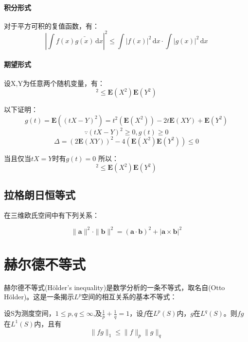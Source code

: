 \documentclass[a4paper]{article} %
\numberwithin{equation}{section} %
\newcommand{\ud}{\,\mathrm{d}}
\begin{document}
\paragraph{积分形式}
对于平方可积的复值函数，有：
$$
\left|\int f(x)\bar{g(x)}\ud x\right|^2\le \int |f(x)|^2\ud x\cdot\int |g(x)|^2\ud x
$$

\paragraph{期望形式}
设X,Y为任意两个随机变量，有：
\begin{equation}
[\mathbf E(XY)]^2\le \mathbf E(X^2)\mathbf E(Y^2)
\end{equation}

以下证明：
\begin{equation}
g(t)= \mathbf E((tX-Y)^2)=t^2(\mathbf E(X^2))-2t\mathbf E(XY)+\mathbf E(Y^2)
\end{equation}
\begin{equation}
\because (tX-Y)^2\ge 0,g(t)\ge 0
\end{equation}
\begin{equation}
\Delta=(2\mathbf E(XY))^2-4(\mathbf E(X^2)\mathbf E(Y^2))\le 0
\end{equation}

当且仅当$tX=Y$时有$g(t)=0$
所以：
\begin{equation}
[\mathbf E(XY)]^2\le \mathbf E(X^2)\mathbf E(Y^2)
\end{equation}

\subsection{拉格朗日恒等式}
在三维欧氏空间中有下列关系：

\begin{equation}
\|{\mathbf  a}\|^{2}\cdot \|{\mathbf  b}\|^{2}=({\mathbf  {a\cdot b}})^{2}+|\mathbf a\times\mathbf  b|^2
\end{equation}

\section{赫尔德不等式}

赫尔德不等式(H\"{o}lder's inequality)是数学分析的一条不等式，取名自(Otto H\"{o}lder)。这是一条揭示$L^p$空间的相互关系的基本不等式：

设S为测度空间，$1\le p,q\le\infty$,及$\frac{1}{p}+\frac{1}{q}=1$，设$f$在$L^p(S)$内，$g$在$L^q(S)$。则$fg$在$L^1(S)$内，且有
$$\|fg\|_1\le \|f\|_p\|g\|_q$$
\end{document}
